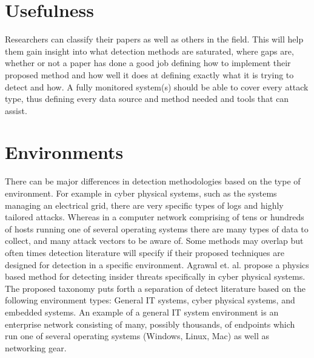 \documentclass[10pt]{IEEEtran}
\begin{document}
\section{Usefulness}
 Researchers can classify their papers as well as others in the field. This will help them gain insight into what detection methods are saturated, where gaps are, whether or not a paper has done a good job defining how to implement their proposed method and how well it does at defining exactly what it is trying to detect and how. A fully monitored system(s) should be able to cover every attack type, thus defining every data source and method needed and tools that can assist. 

\section{Environments}
 There can be major differences in detection methodologies based on the type of environment. For example in cyber physical systems, such as the systems managing an electrical grid, there are very specific types of logs and highly tailored attacks. Whereas in a computer network comprising of tens or hundreds of hosts running one of several operating systems there are many types of data to collect, and many attack vectors to be aware of. Some methods may overlap but often times detection literature will specify if their proposed techniques are designed for detection in a specific environment. Agrawal et. al. propose a physics based method for detecting insider threats specifically in cyber physical systems\cite{agrawal2018poster}.
The proposed taxonomy puts forth a separation of detect literature based on the following environment types: General IT systems, cyber physical systems, and embedded systems. An example of a general IT system environment is an enterprise network consisting of many, possibly thousands, of endpoints which run one of several operating systems (Windows, Linux, Mac) as well as networking gear. 
\end{document}
